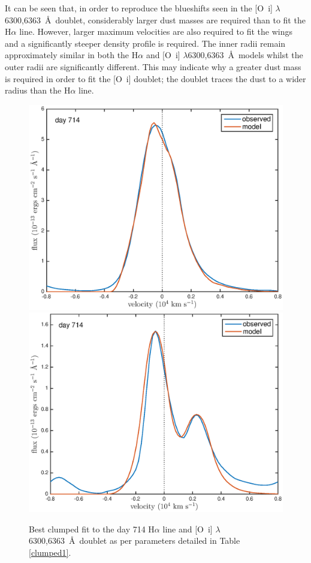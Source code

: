 \documentclass[useAMS,usenatbib,usegraphicx]{mnras}
\begin{document}
It can be seen that, in order to reproduce the blueshifts seen in the 
[O~{\sc i}] $\lambda$6300,6363~\AA\ doublet, considerably larger dust masses 
are required than to fit the H$\alpha$ line.  However, larger maximum 
velocities are also required to fit the wings and a significantly steeper 
density profile is required.  The inner radii remain approximately similar 
in both the H$\alpha$ and [O~{\sc i}] $\lambda$6300,6363~\AA\ models whilst the 
outer radii are significantly different.  This may indicate why a greater 
dust mass is required in order to fit the [O~{\sc i}] doublet; the doublet 
traces the dust to a wider radius than the H$\alpha$ line.


 \begin{figure}
\begin{center}
\includegraphics[trim =37 10 45 15,clip=true,scale=0.51]{clump_1/best_fit/d714Ha}
\includegraphics[trim =37 10 45 15,clip=true,scale=0.51]{clump_1/best_fit/d714OI}
\caption{Best clumped fit to the day 714 H$\alpha$ line and [O~{\sc i}] 
$\lambda$6300,6363~\AA\ doublet as per parameters detailed in 
Table \ref{clumped1}.}
\label{d714_c}
\end{center}
\end{figure}
\end{document}
